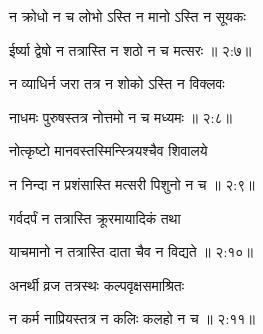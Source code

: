{\devanagarifont न क्रोधो न च लोभो ऽस्ति न मानो ऽस्ति न सूयकः \thinspace{\dandab} \dontdisplaylinenum }%


{\devanagarifont ईर्ष्या द्वेषो न तत्रास्ति न शठो न च मत्सरः {॥ २:७॥} \veg\dontdisplaylinenum }%

{\devanagarifont न व्याधिर्न जरा तत्र न शोको ऽस्ति न विक्लवः \thinspace{\dandab} \dontdisplaylinenum }%


{\devanagarifont नाधमः पुरुषस्तत्र नोत्तमो न च मध्यमः {॥ २:८॥} \veg\dontdisplaylinenum }%
 
{\devanagarifont नोत्कृष्टो मानवस्तस्मिन्स्त्रियश्चैव शिवालये \thinspace{\dandab} \dontdisplaylinenum }%


{\devanagarifont न निन्दा न प्रशंसास्ति मत्सरी पिशुनो न च {॥ २:९॥} \veg\dontdisplaylinenum }%

{\devanagarifont गर्वदर्पं न तत्रास्ति क्रूरमायादिकं तथा \thinspace{\dandab} \dontdisplaylinenum }%
 

{\devanagarifont याचमानो न तत्रास्ति दाता चैव न विद्यते {॥ २:१०॥} \veg\dontdisplaylinenum }%

{\devanagarifont अनर्थी व्रज तत्रस्थः कल्पवृक्षसमाश्रितः \thinspace{\dandab} \dontdisplaylinenum }%


{\devanagarifont न कर्म नाप्रियस्तत्र न कलिः कलहो न च {॥ २:११॥} \veg\dontdisplaylinenum }%

